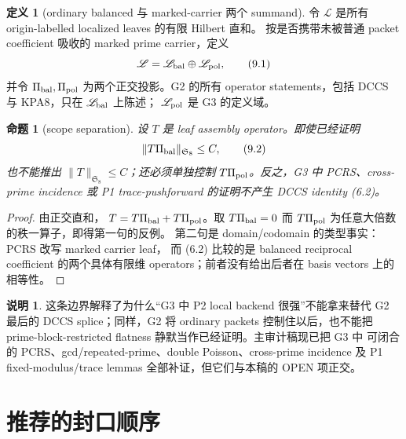 \documentclass[11pt,a4paper]{ctexart}
\newtheorem{proposition}[theorem]{命题}
\theoremstyle{definition}
\newtheorem{definition}[theorem]{定义}
\newtheorem{remark}[theorem]{说明}
\newcommand{\1}{\mathbf 1}
\begin{document}
\begin{definition}[ordinary balanced 与 marked-carrier 两个 summand]
令 $\mathscr L$ 是所有 origin-labelled localized leaves 的有限 Hilbert 直和。
按是否携带未被普通 packet coefficient 吸收的 marked prime carrier，定义
\[
\mathscr L=\mathscr L_{\rm bal}\oplus\mathscr L_{\rm pol},
\tag{9.1}
\]
并令 $\Pi_{\rm bal},\Pi_{\rm pol}$ 为两个正交投影。G2 的所有 operator
statements，包括 DCCS 与 KPA8，只在 $\mathscr L_{\rm bal}$ 上陈述；
$\mathscr L_{\rm pol}$ 是 G3 的定义域。
\end{definition}

\begin{proposition}[scope separation]\label{prop:scope-separation}
设 $T$ 是 leaf assembly operator。即使已经证明
\[
\|T\Pi_{\rm bal}\|_{\mathfrak S_8}\le C,
\tag{9.2}
\]
也不能推出 $\|T\|_{\mathfrak S_8}\le C$；还必须单独控制
$T\Pi_{\rm pol}$。反之，G3 中 PCRS、cross-prime incidence 或 P1
trace-pushforward 的证明不产生 DCCS identity (6.2)。
\end{proposition}

\begin{proof}
由正交直和，
$T=T\Pi_{\rm bal}+T\Pi_{\rm pol}$。取 $T\Pi_{\rm bal}=0$ 而
$T\Pi_{\rm pol}$ 为任意大倍数的秩一算子，即得第一句的反例。
第二句是 domain/codomain 的类型事实：PCRS 改写 marked carrier leaf，
而 (6.2) 比较的是 balanced reciprocal coefficient 的两个具体有限维
operators；前者没有给出后者在 basis vectors 上的相等性。
\end{proof}

\begin{remark}
这条边界解释了为什么“G3 中 P2 local backend 很强”不能拿来替代 G2
最后的 DCCS splice；同样，G2 将 ordinary packets 控制住以后，也不能把
prime-block-restricted flatness 静默当作已经证明。主审计稿现已把 G3 中
可闭合的 PCRS、gcd/repeated-prime、double Poisson、cross-prime incidence
及 P1 fixed-modulus/trace lemmas 全部补证，但它们与本稿的 OPEN 项正交。
\end{remark}

\section{推荐的封口顺序}
\end{document}
